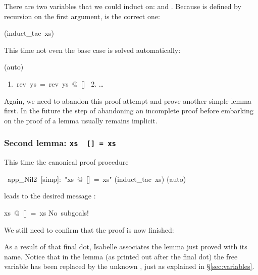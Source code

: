 \begin{isabelle}
\begin{isamarkuptxt}
There are two variables that we could induct on:  and
. Because \isa{\at} is defined by recursion on
the first argument,  is the correct one:%
\end{isamarkuptxt}%
(induct\_tac~xs)%
\begin{isamarkuptxt}%
\noindent
This time not even the base case is solved automatically:%
\end{isamarkuptxt}%
(auto)%
\begin{isamarkuptxt}%
\begin{isabellepar}%
~1.~rev~ys~=~rev~ys~@~[]\isanewline
~2. \dots
\end{isabellepar}%
Again, we need to abandon this proof attempt and prove another simple lemma first.
In the future the step of abandoning an incomplete proof before embarking on
the proof of a lemma usually remains implicit.%
\end{isamarkuptxt}%
%
\begin{isamarkuptext}%
\subsubsection*{Second lemma: \texttt{xs \at~[] = xs}}

This time the canonical proof procedure%
\end{isamarkuptext}%
~app\_Nil2~[simp]:~{"}xs~@~[]~=~xs{"}\isanewline
{}(induct\_tac~xs)\isanewline
{}(auto)%
\begin{isamarkuptxt}%
\noindent
leads to the desired message :
\begin{isabellepar}%
xs~@~[]~=~xs\isanewline
No~subgoals!
\end{isabellepar}%

We still need to confirm that the proof is now finished:%
\end{isamarkuptxt}%
%
\begin{isamarkuptext}%
\noindent{}%
As a result of that final dot, Isabelle associates the lemma
just proved with its name. Notice that in the lemma  (as
printed out after the final dot) the free variable  has been
replaced by the unknown , just as explained in
\S\ref{sec:variables}.


\end{isamarkuptext}
\end{isabelle}
